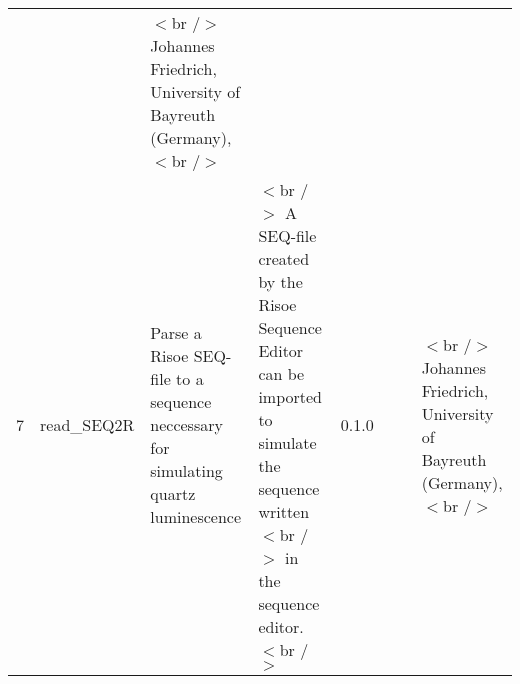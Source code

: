 \begin{table}[ht]
\begin{tabular}{rlllllll}
 &  & $<$br /$>$ Johannes Friedrich, University of Bayreuth (Germany),$<$br /$>$ \\ 
  7 & read\_SEQ2R & Parse a Risoe SEQ-file to a sequence neccessary for simulating quartz luminescence & $<$br /$>$ A SEQ-file created by the Risoe Sequence Editor can be imported to simulate the sequence written$<$br /$>$ in the sequence editor.$<$br /$>$ & 0.1.0
 &  &  & $<$br /$>$ Johannes Friedrich, University of Bayreuth (Germany),$<$br /$>$ \\ 
   \hline
\end{tabular}
\end{table}

